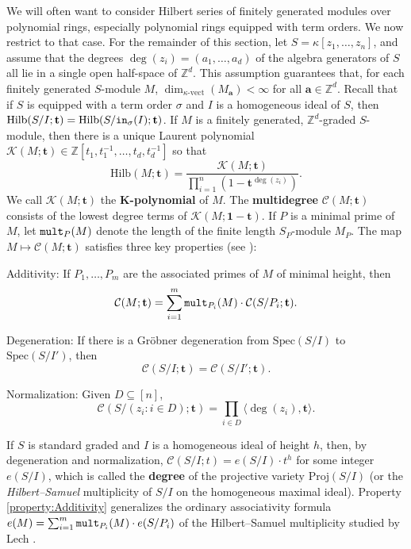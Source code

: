 \documentclass[12pt,reqno]{amsart}
\newtheorem{Main Conjecture}[theorem]{Main Conjecture}
\theoremstyle{remark}
\theoremstyle{plain}
\newcommand{\mydef}[1]{{\bf #1}}
\newcommand{\init}{{\tt in}}
\newcommand{\mult}{{\tt mult}}
\newcommand{\ZZ}{\mathbb{Z}}
\newcommand{\hilb}{\mbox{Hilb}}
\newcommand{\spec}{{\mbox{Spec}}}
\newcommand{\proj}{{\mbox{Proj}}}
\begin{document}
We will often want to consider Hilbert series of finitely generated modules over polynomial rings, especially polynomial rings equipped with term orders.  We now restrict to that case.  For the remainder of this section, let $S = \kappa[z_1, \ldots, z_n]$, and assume that the degrees $\deg(z_{i})=(a_1,\ldots,a_d)$ of the algebra generators of $S$ 
all lie in a single open half-space of $\ZZ^d$.  
This assumption guarantees that, for each finitely generated $S$-module $M$, $\dim_{\kappa\text{-vect}}(M_\mathbf{a})<\infty$ for all $\mathbf{a} \in \ZZ^d$.  Recall that if $S$ is equipped with a term order $\sigma$ and $I$ is a homogeneous ideal of $S$, then $\hilb(S/I; \mathbf t) = \hilb(S/\init_\sigma(I); \mathbf t)$.  If $M$ is a finitely generated, $\ZZ^d$-graded $S$-module, then there is a unique Laurent polynomial $\mathcal{K}(M;\mathbf t) \in \ZZ[t_1, t_1^{-1}, \ldots, t_d, t_d^{-1}]$ so that \[
\hilb(M;\mathbf t) = \dfrac{\mathcal{K}(M;\mathbf t)}{ \displaystyle \prod_{i=1}^n (1-\mathbf t^{\deg(z_i)})}.
\]  We call $\mathcal{K}(M;\mathbf t)$ the \mydef{K-polynomial} of $M$.  The \mydef{multidegree} $\mathcal{C}(M;\mathbf t)$ consists of the lowest degree terms of  $\mathcal{K}(M;\mathbf 1-\mathbf t)$.  If $P$ is a minimal prime of $M$, let $\mult_P(M)$ denote the length of the finite length $S_P$-module $M_P$.  The map $M \mapsto \mathcal C(M;\mathbf t)$ satisfies three key properties (see \cite[Theorem~1.7.1]{KM05}):

\begin{thmlist}
	\item Additivity: If $P_1,\ldots, P_m$ are the associated primes of $M$ of minimal height, then \[\mathcal C(M;\mathbf t)=\sum_{i=1}^m \mult_{P_i}(M)\cdot \mathcal C(S/P_i;\mathbf t).\] \label{property:Additivity}
	\item Degeneration: If there is a Gr\"obner degeneration from $\spec(S/I)$ to $\spec(S/I')$, then \[\mathcal C(S/I;\mathbf t)=\mathcal C(S/I';\mathbf t).\] \label{property:Degeneration}
	\item Normalization: Given $D\subseteq [n]$, \[\mathcal C(S/(z_i:i\in D);\mathbf t)=\prod_{i\in D}\langle \deg(z_i),\mathbf t\rangle.\]\label{property:Normalization}
\end{thmlist}

If $S$ is standard graded and $I$ is a homogeneous ideal of height $h$, then, by degeneration and normalization, $\mathcal{C}(S/I;t) = e(S/I) \cdot t^h$ for some integer $e(S/I)$, which is called the \mydef{degree} of  the projective variety $\proj(S/I)$ (or the \emph{Hilbert--Samuel} multiplicity of $S/I$ on the homogeneous maximal ideal).  Property \ref{property:Additivity}  generalizes the ordinary associativity formula $e(M) =  \sum_{i =1}^m \mult_{P_i}(M) \cdot e(S/P_i)$ of the Hilbert--Samuel multiplicity studied by Lech \cite{Lec57}.
\end{document}
